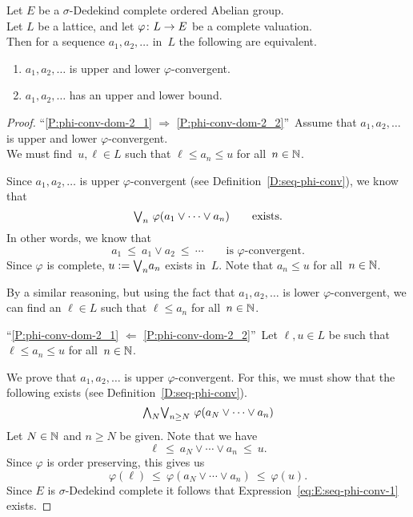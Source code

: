 \documentclass[main.tex]{subfiles}
\begin{document}
%
\begin{prop}
\label{P:phi-conv-dom-2}
Let $E$ be a $\sigma$-Dedekind complete
ordered Abelian group.\\
Let $L$ be a lattice,
and let $\varphi\colon L\rightarrow E$ 
be a complete valuation.\\
Then for a sequence $a_1,a_2,\dotsc$ in~$L$
the following are equivalent.
\begin{enumerate}
\item
\label{P:phi-conv-dom-2_1}
$a_1,a_2,\dotsc$ is upper and lower $\varphi$-convergent.
\item
\label{P:phi-conv-dom-2_2}
$a_1,a_2,\dotsc$ has an upper and lower bound.
\end{enumerate}
\end{prop}
\begin{proof}
``\ref{P:phi-conv-dom-2_1}
$\Longrightarrow$
\ref{P:phi-conv-dom-2_2}''\ 
Assume that  $a_1,a_2,\dotsc$ is upper and lower $\varphi$-convergent.\\
We must find~$u,\ell\in L$ such that $\ell\leq a_n \leq u$
for all~$n\in\mathbb{N}$.

Since $a_1,a_2,\dotsc$ is  upper $\varphi$-convergent
(see Definition~\ref{D:seq-phi-conv}), 
we know that 
\begin{equation*}
\textstyle{\bigvee}_n \ \varphi(a_1 \vee \dotsb \vee a_n)\qquad\text{exists.}
\end{equation*}
In other words, we know that
\begin{equation*}
a_1 \ \leq\ a_1 \vee a_2 \ \leq\ \dotsb \qquad\text{is $\varphi$-convergent.}
\end{equation*}
Since $\varphi$ is complete,
$u:= \textstyle{\bigvee}_n a_n$ exists in~$L$.
Note that $a_n \leq u$ for all~$n\in \mathbb{N}$.

By a similar reasoning, but using the fact that
$a_1,a_2,\dotsc$ is lower $\varphi$-convergent,
we can find an $\ell\in L$ 
such that $\ell \leq a_n$ for all~$n\in \mathbb{N}$.
\vspace{.3em}

\noindent
``\ref{P:phi-conv-dom-2_1}
$\Longleftarrow$
\ref{P:phi-conv-dom-2_2}''\ 
Let $\ell,u\in L$ 
be such that  $\ell \leq a_n \leq u$
for all~$n\in\mathbb{N}$.

We prove that $a_1,a_2,\dotsc$
is upper $\varphi$-convergent.
For this,
we must show that the following exists
(see Definition~\ref{D:seq-phi-conv}).
\begin{equation}
\label{eq:E:seq-phi-conv-1}
\textstyle{\bigwedge}_N \textstyle{\bigvee}_{n\geq N}\ \varphi(a_N\vee\dotsb\vee a_n)
\end{equation}
Let $N\in\mathbb{N}$ and $n\geq N$ be given.
Note that we have 
\begin{equation*}
\ell\ \leq\ a_N \vee \dotsb\vee a_n \ \leq\ u.
\end{equation*}
Since $\varphi$ is order preserving, this gives us
\begin{equation*}
\varphi(\ell)\ \leq\ \varphi(a_N \vee \dotsb\vee a_n) \ \leq\ \varphi(u).
\end{equation*}
Since $E$ is $\sigma$-Dedekind complete
it follows that Expression~\eqref{eq:E:seq-phi-conv-1} exists.


\end{proof}
\end{document}
